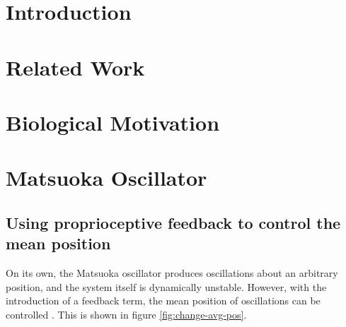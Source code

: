 \documentclass[12pt,twoside]{article}
\theoremstyle{plain}
\theoremstyle{definition}
\theoremstyle{remark}
\begin{document}
\section{Introduction}
\label{sec:introduction}

\section{Related Work}

\section{Biological Motivation}

\section{Matsuoka Oscillator}

\pagebreak

\subsection{Using proprioceptive feedback to control the mean position}
On its own, the Matsuoka oscillator produces oscillations about an arbitrary position, and the system itself is dynamically unstable. However, with the introduction of a feedback term, the mean position of oscillations can be controlled \cite{ronsse2009computational}. This is shown in figure \ref{fig:change-avg-pos}.
\end{document}

